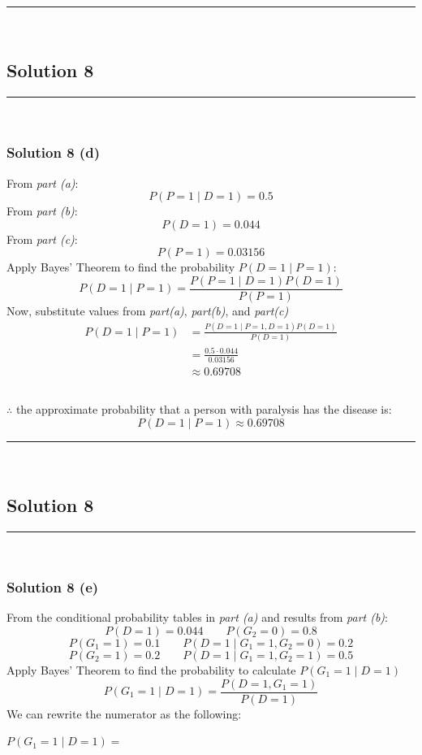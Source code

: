 \documentclass{article}
\begin{document}
\noindent\rule{\textwidth}{0.4pt}\\

\newpage

\subsection*{Solution 8}
\noindent\rule{\textwidth}{0.4pt}\\
\subsubsection*{Solution 8 (d)}
From \textit{part (a)}:
$$P(P=1 \mid D=1) = 0.5$$
From \textit{part (b)}:
$$P(D=1) = 0.044$$
From \textit{part (c)}:
$$P(P=1) = 0.03156$$
Apply Bayes' Theorem to find the probability $P(D=1 \mid P=1)$:
$$P(D=1 \mid P=1) = \frac{P(P=1 \mid D=1) P(D=1)}{P(P=1)}$$
Now, substitute values from \textit{part(a)}, \textit{part(b)}, and \textit{part(c)}
\begin{align*}
    P(D=1 \mid P=1) &= \frac{P(D=1 \mid P=1, D=1)P(D=1)}{P(D=1)} \\
    &= \frac{0.5 \cdot 0.044}{0.03156} \\
    &\approx 0.69708 \\
\end{align*}
\subsubsection*{\normalfont}{$\therefore$ the approximate probability that a person with paralysis has the disease is:}
$$P(D=1 \mid P=1) \approx 0.69708$$

\noindent\rule{\textwidth}{0.4pt}\\

\newpage

\subsection*{Solution 8}
\noindent\rule{\textwidth}{0.4pt}\\
\subsubsection*{Solution 8 (e)}
From the conditional probability tables  in \textit{part (a)} and results from \textit{part (b)}:
$$P(D=1) = 0.044 \qquad P(G_2=0) = 0.8 $$
$$P(G_1=1) = 0.1 \qquad P(D=1 \mid G_1=1, G_2=0) = 0.2 $$
$$P(G_2=1) = 0.2 \qquad P(D=1 \mid G_1=1, G_2=1) = 0.5 $$
Apply Bayes' Theorem to find the probability to calculate $P(G_1=1 \mid D=1)$
$$ P(G_1=1 \mid D=1) = \frac{P(D=1, G_1=1)}{P(D=1)} $$
We can rewrite the numerator as the following:
\begin{flushleft}
    $P(G_1=1 \mid D=1) = $
\end{flushleft}
\end{document}
